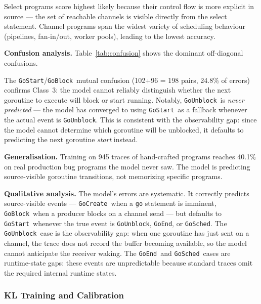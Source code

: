 \documentclass[10pt,conference]{IEEEtran}
\newcommand{\eblock}{\texttt{GoBlock}}
\newcommand{\eunblock}{\texttt{GoUnblock}}
\newcommand{\estart}{\texttt{GoStart}}
\newcommand{\ecreate}{\texttt{GoCreate}}
\newcommand{\eend}{\texttt{GoEnd}}
\newcommand{\esched}{\texttt{GoSched}}
\begin{document}
Select programs score highest likely because their control flow is more
explicit in source — the set of reachable channels is visible directly
from the select statement.
Channel programs span the widest variety of scheduling behaviour
(pipelines, fan-in/out, worker pools), leading to the lowest accuracy.

\textbf{Confusion analysis.}
Table~\ref{tab:confusion} shows the dominant off-diagonal confusions.

The \estart/\eblock\ mutual confusion (102+96 = 198 pairs, 24.8\%
of errors) confirms Class~3: the model cannot reliably distinguish
whether the next goroutine to execute will block or start running.
Notably, \eunblock\ is \emph{never predicted} — the model has
converged to using \estart\ as a fallback whenever the actual event
is \eunblock.
This is consistent with the observability gap: since the model cannot
determine which goroutine will be unblocked, it defaults to predicting
the next goroutine \emph{start} instead.

\textbf{Generalisation.}
Training on 945 traces of hand-crafted programs reaches 40.1\% on
real production bug programs the model never saw.
The model is predicting source-visible goroutine transitions, not
memorizing specific programs.

\textbf{Qualitative analysis.}
The model's errors are systematic. It correctly predicts source-visible
events — \ecreate\ when a \texttt{go} statement is imminent, \eblock\
when a producer blocks on a channel send — but defaults to \estart\
whenever the true event is \eunblock, \eend, or \esched.
The \eunblock\ case is the observability gap: when one goroutine has
just sent on a channel, the trace does not record the buffer becoming
available, so the model cannot anticipate the receiver waking.
The \eend\ and \esched\ cases are runtime-state gaps: these events are unpredictable because standard traces omit the required internal runtime states.

\subsubsection{KL Training and Calibration}\label{sec:calibration}
\end{document}
